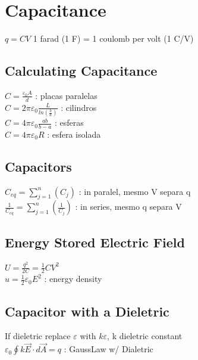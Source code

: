 \section{Capacitance}
$q=CV$ 1 farad (1 F) = 1 coulomb per volt (1 C/V)\\
\subsection{Calculating Capacitance}
$C=\frac{\varepsilon _0A}{d}$ : placas paralelas\\
$C=2\pi \varepsilon _0\frac{L}{ln\left(\frac{b}{a}\right)}$ : cilindros\\
$C=4\pi \varepsilon _0\frac{ab}{b-a}$ : esferas\\
$C=4\pi \varepsilon _0R$ : esfera isolada\\
\subsection{Capacitors}
$C_{eq}=\sum _{j=1}^n\left(C_j\right)$ : in paralel, mesmo V separa q\\
$\frac{1}{C_{eq}}=\sum _{j=1}^n\left(\frac{1}{C_j}\right)$ : in series, mesmo q separa V\\
\subsection{Energy Stored Electric Field}
$U=\frac{q^2}{2C}=\frac{1}{2}CV^2$\\
$u=\frac{1}{2}\varepsilon _0E^2$ : energy density\\
\subsection{Capacitor with a Dieletric}
If dieletric replace $\varepsilon$ with $k\varepsilon$, k dieletric constant\\
$\varepsilon _0\oint k\vec{E}\cdot d\vec{A}=q$ : GaussLaw w/ Dialetric\\

